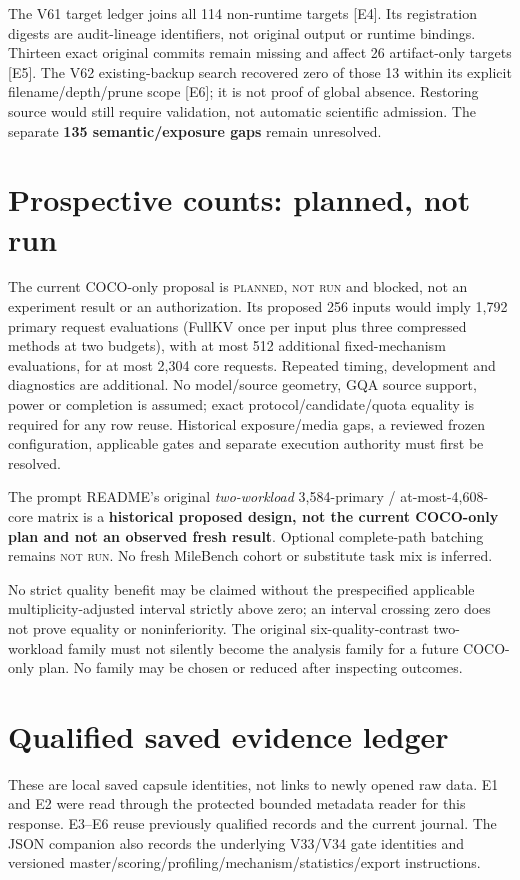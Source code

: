 \documentclass[10pt]{article}
\newcommand{\notrun}{\textsc{planned, not run}}
\begin{document}
The V61 target ledger joins all 114 non-runtime targets [E4]. Its registration
digests are audit-lineage identifiers, not original output or runtime bindings.
Thirteen exact original commits remain missing and affect 26 artifact-only
targets [E5]. The V62 existing-backup search recovered zero of those 13 within
its explicit filename/depth/prune scope [E6]; it is not proof of global absence.
Restoring source would still require validation, not automatic scientific
admission. The separate \textbf{135 semantic/exposure gaps} remain unresolved.

\section*{Prospective counts: planned, not run}

The current COCO-only proposal is \notrun{} and blocked, not an experiment
result or an authorization. Its proposed 256 inputs would imply 1,792 primary
request evaluations (FullKV once per input plus three compressed methods at
two budgets), with at most 512 additional fixed-mechanism evaluations, for at
most 2,304 core requests. Repeated timing, development and diagnostics are
additional. No model/source geometry, GQA source support, power or completion
is assumed; exact protocol/candidate/quota equality is required for any row
reuse. Historical exposure/media gaps, a reviewed frozen configuration,
applicable gates and separate execution authority must first be resolved.

The prompt README's original \emph{two-workload} 3,584-primary / at-most-4,608-core
matrix is a \textbf{historical proposed design, not the current COCO-only plan
and not an observed fresh result}. Optional complete-path batching remains
\textsc{not run}. No fresh MileBench cohort or substitute task mix is inferred.

No strict quality benefit may be claimed without the prespecified applicable
multiplicity-adjusted interval strictly above zero; an interval crossing zero
does not prove equality or noninferiority. The original six-quality-contrast
two-workload family must not silently become the analysis family for a future
COCO-only plan. No family may be chosen or reduced after inspecting outcomes.

\section*{Qualified saved evidence ledger}

These are local saved capsule identities, not links to newly opened raw data.
E1 and E2 were read through the protected bounded metadata reader for this
response. E3--E6 reuse previously qualified records and the current journal.
The JSON companion also records the underlying V33/V34 gate identities and
versioned master/scoring/profiling/mechanism/statistics/export instructions.
\end{document}
